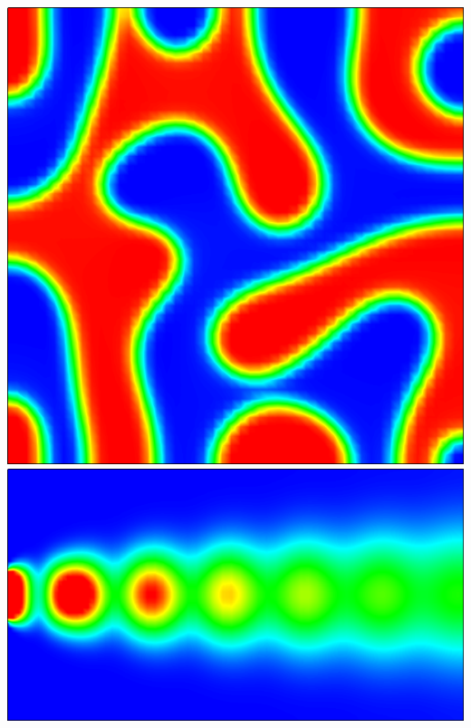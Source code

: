 \documentclass[compress,newPxFont,sthlmFooter]{beamer}
\begin{document}
\begin{frame}[plain]
\begin{itemize}
{      }
    \end{itemize}
    \begin{center}
        \includegraphics[align=c, height=0.30\textheight]{cahn-hilliard.png}
        \;
        \includegraphics[align=c, height=0.30\textheight]{heat_convection.png}
        \;

\end{center}
\end{frame}
\end{document}
